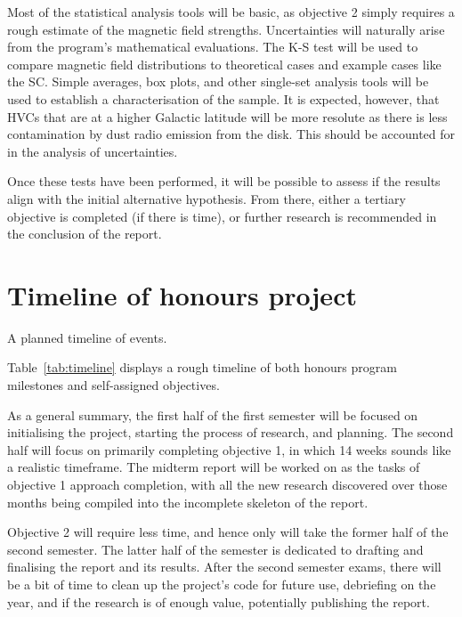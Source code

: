 Most of the statistical analysis tools will be basic, as objective 2 simply requires a rough estimate of the magnetic field strengths. Uncertainties will naturally arise from the program's mathematical evaluations. The K-S test will be used to compare magnetic field distributions to theoretical cases and example cases like the SC. Simple averages, box plots, and other single-set analysis tools will be used to establish a characterisation of the sample. It is expected, however, that HVCs that are at a higher Galactic latitude will be more resolute as there is less contamination by dust radio emission from the disk. This should be accounted for in the analysis of uncertainties.

Once these tests have been performed, it will be possible to assess if the results align with the initial alternative hypothesis. From there, either a tertiary objective is completed (if there is time), or further research is recommended in the conclusion of the report.

\section{Timeline of honours project}
\label{sec:timeline}

\begin{table}[ht]
  \centering
  
  \caption{A planned timeline of events.}
  \label{tab:timeline}
\end{table}

Table~\ref{tab:timeline} displays a rough timeline of both honours program milestones and self-assigned objectives.

As a general summary, the first half of the first semester will be focused on initialising the project, starting the process of research, and planning. The second half will focus on primarily completing objective 1, in which 14 weeks sounds like a realistic timeframe. The midterm report will be worked on as the tasks of objective 1 approach completion, with all the new research discovered over those months being compiled into the incomplete skeleton of the report.

Objective 2 will require less time, and hence only will take the former half of the second semester. The latter half of the semester is dedicated to drafting and finalising the report and its results. After the second semester exams, there will be a bit of time to clean up the project's code for future use, debriefing on the year, and if the research is of enough value, potentially publishing the report.

